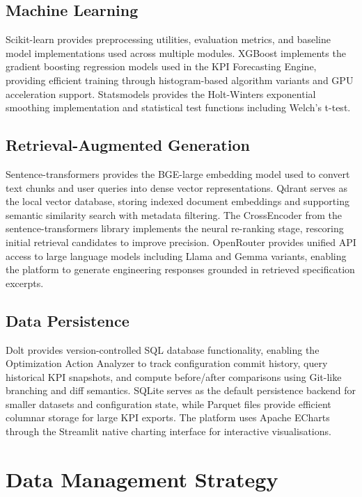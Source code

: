 \subsection{Machine Learning}

Scikit-learn provides preprocessing utilities, evaluation metrics, and baseline model implementations used across multiple modules. XGBoost implements the gradient boosting regression models used in the KPI Forecasting Engine, providing efficient training through histogram-based algorithm variants and GPU acceleration support. Statsmodels provides the Holt-Winters exponential smoothing implementation and statistical test functions including Welch's t-test.

\subsection{Retrieval-Augmented Generation}

Sentence-transformers provides the BGE-large embedding model used to convert text chunks and user queries into dense vector representations. Qdrant serves as the local vector database, storing indexed document embeddings and supporting semantic similarity search with metadata filtering. The CrossEncoder from the sentence-transformers library implements the neural re-ranking stage, rescoring initial retrieval candidates to improve precision. OpenRouter provides unified API access to large language models including Llama and Gemma variants, enabling the platform to generate engineering responses grounded in retrieved specification excerpts.

\subsection{Data Persistence}

Dolt provides version-controlled SQL database functionality, enabling the Optimization Action Analyzer to track configuration commit history, query historical KPI snapshots, and compute before/after comparisons using Git-like branching and diff semantics. SQLite serves as the default persistence backend for smaller datasets and configuration state, while Parquet files provide efficient columnar storage for large KPI exports. The platform uses Apache ECharts through the Streamlit native charting interface for interactive visualisations.

\section{Data Management Strategy}

